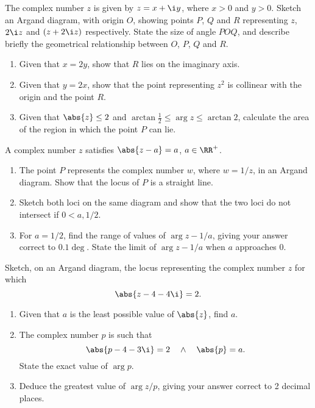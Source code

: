 \begin{problem}
    The complex number $z$ is given by $z = x + \i y$, where $x > 0$ and $y > 0$. Sketch an Argand diagram, with origin $O$, showing points $P$, $Q$ and $R$ representing $z$, $2\i z$ and $(z + 2\i z)$ respectively. State the size of angle $POQ$, and describe briefly the geometrical relationship between $O$, $P$, $Q$ and $R$.

    \begin{enumerate}
        \item Given that $x = 2y$, show that $R$ lies on the imaginary axis.
        \item Given that $y = 2x$, show that the point representing $z^2$ is collinear with the origin and the point $R$.
        \item Given that $\abs{z} \leq 2$ and $\arctan \frac12 \leq \arg z \leq \arctan 2$, calculate the area of the region in which the point $P$ can lie.
    \end{enumerate}
\end{problem}

\begin{problem}
    A complex number $z$ satisfies $\abs{z - a} = a$, $a \in \RR^+$.

    \begin{enumerate}
        \item The point $P$ represents the complex number $w$, where $w = 1/z$, in an Argand diagram. Show that the locus of $P$ is a straight line.
        \item Sketch both loci on the same diagram and show that the two loci do not intersect if $0 < a , 1/2$.
        \item For $a = 1/2$, find the range of values of $\arg{z - 1/a}$, giving your answer correct to $0.1\deg$. State the limit of $\arg{z - 1/a}$ when $a$ approaches 0.
    \end{enumerate}
\end{problem}

\begin{problem}
    Sketch, on an Argand diagram, the locus representing the complex number $z$ for which \[\abs{z - 4 - 4\i} = 2.\]

    \begin{enumerate}
        \item Given that $a$ is the least possible value of $\abs{z}$, find $a$.
        \item The complex number $p$ is such that \[\abs{p - 4 - 3\i} = 2 \quad \land \quad \abs{p} = a.\] State the exact value of $\arg p$.
        \item Deduce the greatest value of $\arg{z/p}$, giving your answer correct to 2 decimal places.
    \end{enumerate}
\end{problem}


